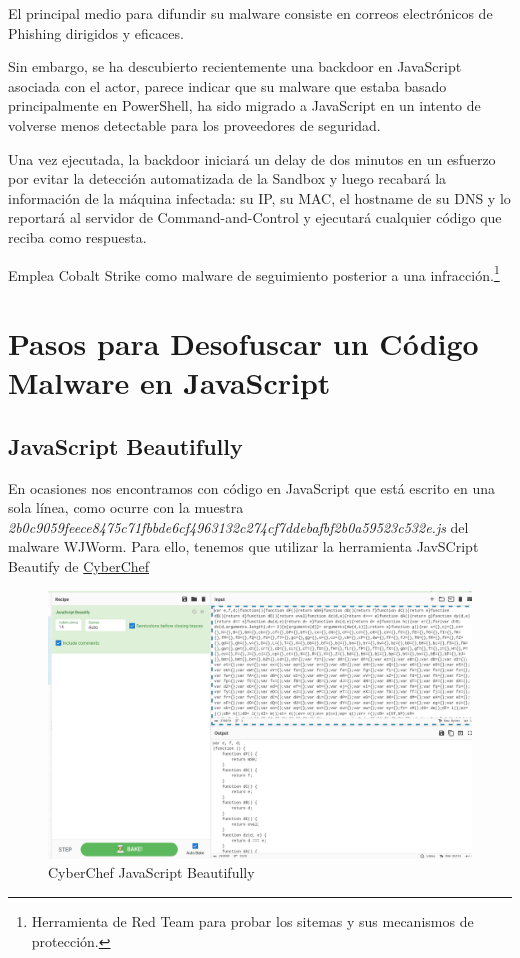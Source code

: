 \documentclass[15pt]{article}
\begin{document}
	El principal medio para difundir su malware consiste en correos electrónicos de Phishing dirigidos y eficaces.
	
	Sin embargo, se ha descubierto recientemente una backdoor en JavaScript asociada con el actor, parece indicar que su malware que estaba basado principalmente en PowerShell, ha sido migrado a JavaScript en un intento de volverse menos detectable para los proveedores de seguridad.
	
	Una vez ejecutada, la backdoor iniciará un delay de dos minutos en un esfuerzo por evitar la detección automatizada de la Sandbox y luego recabará la información de la máquina infectada: su IP, su MAC, el hostname de su DNS y lo reportará al servidor de Command-and-Control y ejecutará cualquier código que reciba como respuesta.
	
	Emplea Cobalt Strike\cite{cobaltstrike} como malware de seguimiento posterior a una infracción.\footnote{Herramienta de Red Team para probar los sitemas y sus mecanismos de protección. }
	
	\newpage
	\section{Pasos para Desofuscar un Código Malware en JavaScript}
		
	\subsection{JavaScript Beautifully}
	En ocasiones nos encontramos con código en JavaScript que está escrito en una sola línea, como ocurre con la muestra \textit{2b0c9059feece8475c71fbbde6cf4963132c274cf7ddebafbf2b0a59523c532e.js} del malware WJWorm. Para ello, tenemos que utilizar la herramienta JavSCript Beautify de \href{https://gchq.github.io/CyberChef}{CyberChef}
	
	\begin{figure}[H]
		\centering
		\includegraphics[width=18cm]{images/beautifully.png}
		\caption{CyberChef JavaScript Beautifully}
	\end{figure}
	
\end{document}

